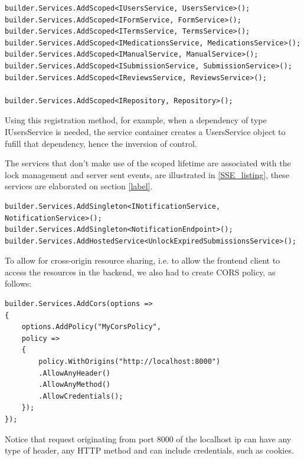 \begin{lstlisting}[style=sharpc, caption={Registering Scoped Services in ASP.NET Core Dependency Injection Container.}, label={DI}]
builder.Services.AddScoped<IUsersService, UsersService>();
builder.Services.AddScoped<IFormService, FormService>();
builder.Services.AddScoped<ITermsService, TermsService>();
builder.Services.AddScoped<IMedicationsService, MedicationsService>();
builder.Services.AddScoped<IManualService, ManualService>();
builder.Services.AddScoped<ISubmissionService, SubmissionService>();
builder.Services.AddScoped<IReviewsService, ReviewsService>();

builder.Services.AddScoped<IRepository, Repository>();
\end{lstlisting}

Using this registration method, for example, when a dependency of type IUsersService is needed, the service container creates a UsersService object to fufill that dependency, hence the inversion of control.

The services that don't make use of the scoped lifetime are associated with the lock management and server sent events, are illustrated in \ref{SSE_listing}, these services are elaborated on section \ref{label}.

\begin{lstlisting}[style=sharpc, caption={Registering Scoped Services in ASP.NET Core Dependency Injection Container:}, label={SSE_listing}]
builder.Services.AddSingleton<INotificationService, NotificationService>();
builder.Services.AddSingleton<NotificationEndpoint>();
builder.Services.AddHostedService<UnlockExpiredSubmissionsService>();

\end{lstlisting}

To allow for cross-origin resource sharing, i.e. to allow the frontend client to access the resources in the backend, we also had to create CORS policy, as follows:

\begin{lstlisting}[style=sharpc, caption={Configuring CORS Policy in ASP.NET Core: Allowing Specific Origin with Full Access Control.}]
builder.Services.AddCors(options =>
{
	options.AddPolicy("MyCorsPolicy",
	policy =>
	{
		policy.WithOrigins("http://localhost:8000")
		.AllowAnyHeader()
		.AllowAnyMethod()
		.AllowCredentials();
	});
});
\end{lstlisting}

Notice that request originating from port 8000 of the localhost ip can have any type of header, any HTTP method and can include credentials, such as cookies.
\newpage


